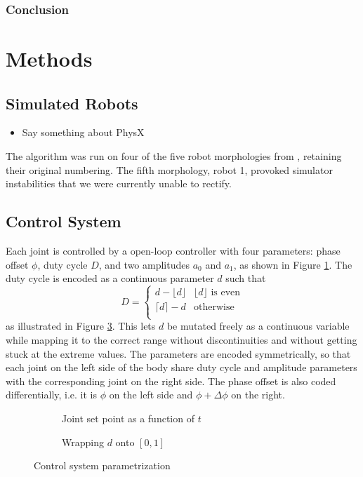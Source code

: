 \documentclass[sigconf, anonymous=false]{acmart}
\newcommand{\floor}[1]{{\lfloor #1 \rfloor}}
\newcommand{\ceil}[1]{{\lceil #1 \rceil}}
\begin{document}
\subsubsection*{Conclusion}



\section{Methods}

\subsection{Simulated Robots}\label{method:robots}

\begin{itemize}
\item Say something about PhysX
\end{itemize}

The algorithm was run on four of the five robot morphologies from \cite{Samuelsen2015}, retaining their original numbering. The fifth morphology, robot 1, provoked simulator instabilities that we were currently unable to rectify. 


\subsection{Control System}\label{method:control}
Each joint is controlled by a open-loop controller with four parameters: phase offset $\phi$, duty cycle $D$, and two amplitudes $a_0$ and $a_1$, as shown in Figure \ref{fig:control}. The duty cycle is encoded as a continuous parameter $d$ such that 
\[ 
 D = 
 \begin{cases} 
 d-\floor{d} & \floor{d}\text{ is even} \\
 \ceil{d}-d  & \text{otherwise} \\
 \end{cases}
\]
as illustrated in Figure \ref{fig:dwrap}. This lets $d$ be mutated freely as a continuous variable while mapping it to the correct range without discontinuities and without getting stuck at the extreme values. The parameters are encoded symmetrically, so that each joint on the left side of the body share duty cycle and amplitude parameters with the corresponding joint on the right side. The phase offset is also coded differentially, i.e. it is $\phi$ on the left side and $\phi + \Delta\phi$ on the right.

\begin{figure}
\begin{subfigure}[t]{\columnwidth}

\vspace{-18pt}
\caption{Joint set point as a function of $t$}
\label{fig:control}
\end{subfigure}
\begin{subfigure}[t]{\columnwidth}

\vspace{-18pt}
\caption{Wrapping $d$ onto $\left[0, 1\right]$}
\label{fig:dwrap}
\end{subfigure}
\caption{Control system parametrization}
\end{figure}
\end{document}
